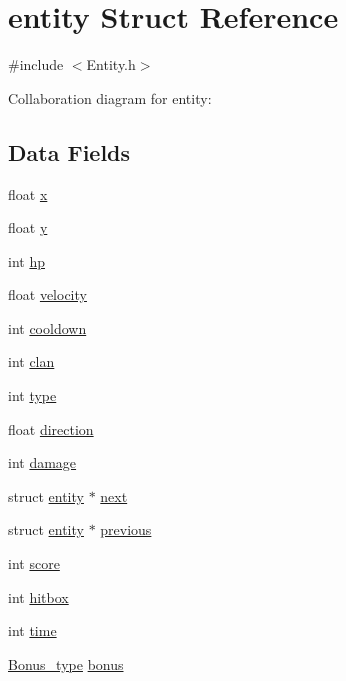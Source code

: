 \hypertarget{structentity}{}\section{entity Struct Reference}
\label{structentity}


{\ttfamily \#include $<$Entity.\+h$>$}



Collaboration diagram for entity\+:
\subsection*{Data Fields}
\begin{DoxyCompactItemize}
\item 
float \hyperlink{structentity_ad0da36b2558901e21e7a30f6c227a45e}{x}
\item 
float \hyperlink{structentity_aa4f0d3eebc3c443f9be81bf48561a217}{y}
\item 
int \hyperlink{structentity_a9aa790f93d2d067a4f5608fdb8409f94}{hp}
\item 
float \hyperlink{structentity_ac46e821ae08930cc9e257642e34275a3}{velocity}
\item 
int \hyperlink{structentity_af6120b55f42d5cb6044788bba68b9521}{cooldown}
\item 
int \hyperlink{structentity_af3f30fa8b50e44df12b56cd7b0033da0}{clan}
\item 
int \hyperlink{structentity_ac765329451135abec74c45e1897abf26}{type}
\item 
float \hyperlink{structentity_a8f54e9f41016004732115c10e844deb8}{direction}
\item 
int \hyperlink{structentity_a9b39867abc3f09243fcdc739bd9e6c90}{damage}
\item 
struct \hyperlink{structentity}{entity} $\ast$ \hyperlink{structentity_a003db4878d2160d7c60c600d716094b2}{next}
\item 
struct \hyperlink{structentity}{entity} $\ast$ \hyperlink{structentity_abdec4e7d3433b984eebbdbb4606e293a}{previous}
\item 
int \hyperlink{structentity_aef160b7437d94056f1dc59646cd5b87d}{score}
\item 
int \hyperlink{structentity_adf58bef654884ab6c521153b0f99a82e}{hitbox}
\item 
int \hyperlink{structentity_a42715f65f02da52edc5b22021d8ae670}{time}
\item 
\hyperlink{_values_8h_a49bda12b1a33f2261caaf3f914078c4c}{Bonus\+\_\+type} \hyperlink{structentity_ac6032b9a092ec0123e235376f915abf7}{bonus}
\end{DoxyCompactItemize}


